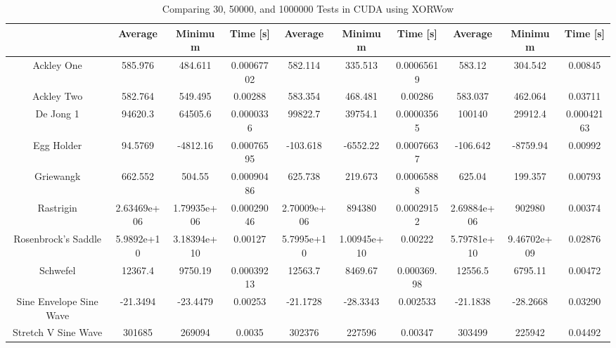 \documentclass{article}
\begin{document}
	\begin{table}[h]
        \begin{centering}
            \begin{tabular}{|c||c|c|c||c|c|c||c|c|c||}
                \hline
                            & Average & Minimum & Time [s] & Average & Minimum & Time [s] & Average & Minimum & Time [s] \\
                \hline
                \hline
                Ackley One & 585.976 & 484.611 & 0.00067702 & 582.114 & 335.513 & 0.00065619 & 583.12 & 304.542 & 0.00845 \\ 
                \hline
                Ackley Two & 582.764 & 549.495 & 0.00288 & 583.354 & 468.481 & 0.00286 & 583.037 & 462.064 & 0.03711 \\
                \hline
                De Jong 1 & 94620.3 & 64505.6 & 0.0000336 & 99822.7 & 39754.1 & 0.00003565 & 100140 & 29912.4 & 0.00042163\\
                \hline
                Egg Holder & 94.5769 & -4812.16 & 0.00076595 & -103.618 & -6552.22 & 0.00076637 & -106.642 & -8759.94 & 0.00992 \\
                \hline
                Griewangk & 662.552 & 504.55 & 0.00090486 & 625.738 & 219.673 & 0.00065888 & 625.04 & 199.357 & 0.00793 \\
                \hline
                Rastrigin & 2.63469e+06 & 1.79935e+06 & 0.00029046 & 2.70009e+06 & 894380 & 0.00029152 & 2.69884e+06 & 902980 & 0.00374 \\
                \hline
                Rosenbrock's Saddle & 5.9892e+10 & 3.18394e+10 & 0.00127 & 5.7995e+10 & 1.00945e+10 & 0.00222 & 5.79781e+10 & 9.46702e+09 & 0.02876\\
                \hline
                Schwefel & 12367.4 & 9750.19 & 0.00039213 & 12563.7 & 8469.67 & 0.000369.98 & 12556.5 & 6795.11 & 0.00472 \\
                \hline
                Sine Envelope Sine Wave & -21.3494 & -23.4479 & 0.00253 & -21.1728 & -28.3343 & 0.002533 & -21.1838 & -28.2668 & 0.03290 \\
                \hline
                Stretch V Sine Wave & 301685 & 269094 & 0.0035 & 302376 & 227596 & 0.00347 & 303499 & 225942 & 0.04492 \\
                \hline
            \end{tabular}
            \caption{Comparing 30, 50000, and 1000000 Tests in CUDA using XORWow}
        \end{centering}
        \end{table}
\end{document}
